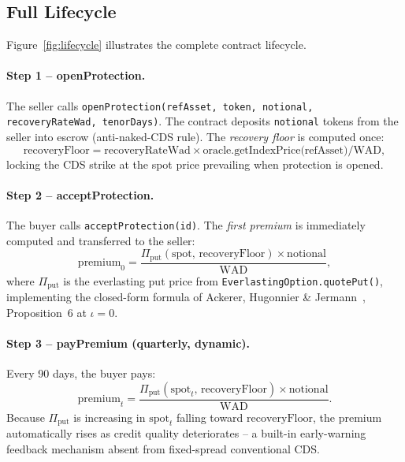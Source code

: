 \documentclass[12pt]{article}
\theoremstyle{plain}
\theoremstyle{definition}
\theoremstyle{remark}
\begin{document}
\subsection{Full Lifecycle}

Figure~\ref{fig:lifecycle} illustrates the complete contract lifecycle.

\paragraph{Step 1 -- openProtection.}
The seller calls \texttt{openProtection(refAsset, token, notional,}
\texttt{recoveryRateWad, tenorDays)}.
The contract deposits \texttt{notional} tokens from the seller into escrow
(anti-naked-CDS rule).
The \emph{recovery floor} is computed once:
\begin{equation}
  \text{recoveryFloor} = \text{recoveryRateWad} \times
    \text{oracle.getIndexPrice(refAsset)} / \text{WAD},
\end{equation}
locking the CDS strike at the spot price prevailing when protection is opened.

\paragraph{Step 2 -- acceptProtection.}
The buyer calls \texttt{acceptProtection(id)}.
The \emph{first premium} is immediately computed and transferred to the seller:
\begin{equation}
  \text{premium}_0 = \frac{\Pi_{\text{put}}(\text{spot},\,\text{recoveryFloor})
    \times \text{notional}}{\text{WAD}},
\end{equation}
where $\Pi_{\text{put}}$ is the everlasting put price from
\texttt{EverlastingOption.quotePut()}, implementing the closed-form formula
of Ackerer, Hugonnier \& Jermann~\cite{AHJ2024}, Proposition~6 at $\iota=0$.

\paragraph{Step 3 -- payPremium (quarterly, dynamic).}
Every 90 days, the buyer pays:
\begin{equation}
  \text{premium}_t = \frac{\Pi_{\text{put}}(\text{spot}_t,\,\text{recoveryFloor})
    \times \text{notional}}{\text{WAD}}.
\end{equation}
Because $\Pi_{\text{put}}$ is increasing in $\text{spot}_t$ falling toward
$\text{recoveryFloor}$, the premium automatically rises as credit quality
deteriorates -- a built-in early-warning feedback mechanism absent from
fixed-spread conventional CDS.
\end{document}
